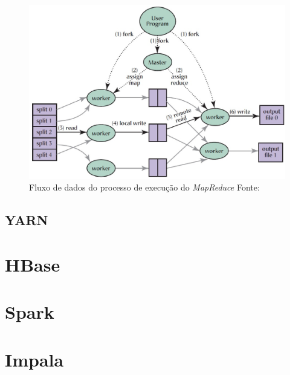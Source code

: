                 \begin{figure}[ht!]
                    \centering
                    \includegraphics[keepaspectratio=true,scale=0.5]
                        {figuras/figura6.eps}
                    \caption[Fluxo de dados do processo de execução do \textit{MapReduce}]
                    {Fluxo de dados do processo de execução do \textit{MapReduce}
                    \protect \linebreak Fonte: }
                    \label{figura6}
                \end{figure}



        \subsection{YARN}


    \section{HBase}

    \section{Spark}

    \section{Impala}



